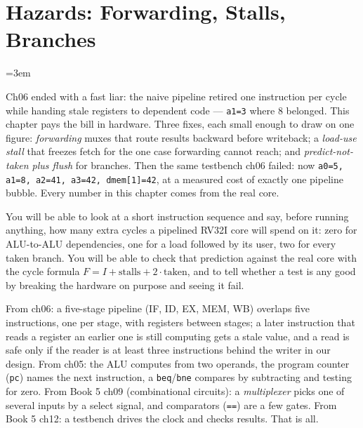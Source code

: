 \chapter{Hazards: Forwarding, Stalls, Branches}
\label{ch:hazards07}
\emergencystretch=3em

Ch06 ended with a fast liar: the naive pipeline retired one
instruction per cycle while handing stale registers to dependent
code --- \texttt{a1=3} where 8 belonged. This chapter pays the bill
in hardware. Three fixes, each small enough to draw on one figure:
\emph{forwarding} muxes that route results backward before
writeback; a \emph{load-use stall} that freezes fetch for the one
case forwarding cannot reach; and \emph{predict-not-taken plus
flush} for branches. Then the same testbench ch06 failed: now
\texttt{a0=5, a1=8, a2=41, a3=42, dmem[1]=42}, at a measured cost
of exactly one pipeline bubble. Every number in this chapter comes
from the real core.

\begin{wins}
You will be able to look at a short instruction sequence and say, before
running anything, how many extra cycles a pipelined RV32I core will
spend on it: zero for ALU-to-ALU dependencies, one for a load followed
by its user, two for every taken branch. You will be able to check
that prediction against the real core with the cycle formula
$F = I + \text{stalls} + 2\cdot\text{taken}$, and to tell whether a
test is any good by breaking the hardware on purpose and seeing it
fail.
\end{wins}

\begin{rulebox}
From ch06: a five-stage pipeline (IF, ID, EX, MEM, WB) overlaps five
instructions, one per stage, with registers between stages; a later
instruction that reads a register an earlier one is still computing
gets a stale value, and a read is safe only if the reader is at least
three instructions behind the writer in our design. From ch05: the ALU
computes from two operands, the program counter (\texttt{pc}) names the
next instruction, a \texttt{beq}/\texttt{bne} compares by subtracting
and testing for zero. From Book 5 ch09 (combinational circuits): a
\emph{multiplexer} picks one of several inputs by a select signal, and
comparators (\texttt{==}) are a few gates. From Book 5 ch12: a
testbench drives the clock and checks results. That is all.
\end{rulebox}

